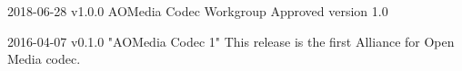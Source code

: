 
\begin{DoxyVerbInclude}
2018-06-28 v1.0.0
  AOMedia Codec Workgroup Approved version 1.0

2016-04-07 v0.1.0 "AOMedia Codec 1"
  This release is the first Alliance for Open Media codec.
\end{DoxyVerbInclude}
 